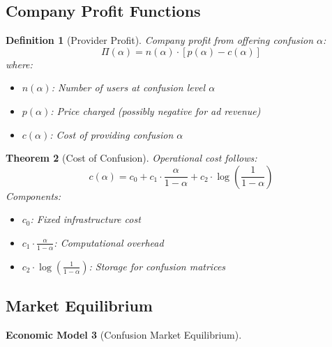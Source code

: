 \documentclass[11pt,final]{article}
\newcommand{\Profit}{\Pi}
\newtheorem{theorem}{Theorem}[section]
\newtheorem{definition}[theorem]{Definition}
\newtheorem{model}[theorem]{Economic Model}
\begin{document}
\subsection{Company Profit Functions}

\begin{definition}[Provider Profit]
Company profit from offering confusion $\alpha$:
\begin{equation}
\Profit(\alpha) = n(\alpha) \cdot [p(\alpha) - c(\alpha)]
\end{equation}
where:
\begin{itemize}
    \item $n(\alpha)$: Number of users at confusion level $\alpha$
    \item $p(\alpha)$: Price charged (possibly negative for ad revenue)
    \item $c(\alpha)$: Cost of providing confusion $\alpha$
\end{itemize}
\end{definition}

\begin{theorem}[Cost of Confusion]
Operational cost follows:
\begin{equation}
c(\alpha) = c_0 + c_1 \cdot \frac{\alpha}{1-\alpha} + c_2 \cdot \log\left(\frac{1}{1-\alpha}\right)
\end{equation}
Components:
\begin{itemize}
    \item $c_0$: Fixed infrastructure cost
    \item $c_1 \cdot \frac{\alpha}{1-\alpha}$: Computational overhead
    \item $c_2 \cdot \log\left(\frac{1}{1-\alpha}\right)$: Storage for confusion matrices
\end{itemize}
\end{theorem}

\subsection{Market Equilibrium}

\begin{model}[Confusion Market Equilibrium]
\begin{center}
\end{center}
\end{model}
\end{document}
